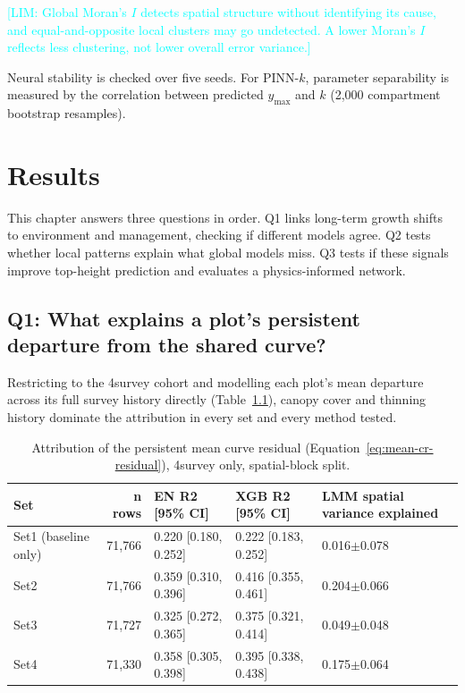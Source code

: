 \documentclass[logo,msc,ai]{infthesis}           %
\newcommand{\limit}[1]{\textcolor{cyan}{[LIM: #1]}}
\begin{document}
\limit{Global Moran's $I$ detects spatial structure without identifying its cause, and equal-and-opposite local clusters may go undetected. A lower Moran's $I$ reflects less clustering, not lower overall error variance.}

Neural stability is checked over five seeds. For PINN-$k$, parameter separability is measured by the correlation between predicted $y_{\max}$ and $k$ (2,000 compartment bootstrap resamples).









\chapter{Results} \label{ch:results}
This chapter answers three questions in order. Q1 links long-term growth shifts to environment and management, checking if different models agree. Q2 tests whether local patterns explain what global models miss. Q3 tests if these signals improve top-height prediction and evaluates a physics-informed network.

\section{Q1: What explains a plot's persistent departure from the shared curve?}

Restricting to the 4survey cohort and modelling each plot's mean departure across its
full survey history directly (Table~\ref{tab:results-rq2b}), canopy cover and thinning
history dominate the attribution in every set and every method tested.

\begin{table}[!htbp]
\centering
\scriptsize
\renewcommand{\arraystretch}{1.2}
\begin{tabular}{lrlll}
\toprule
Set & n rows & EN R2 [95\% CI] & XGB R2 [95\% CI] & LMM spatial variance explained \\
\midrule
Set1 (baseline only) & 71{,}766 & 0.220 [0.180, 0.252] & 0.222 [0.183, 0.252] & 0.016$\pm$0.078 \\
Set2 & 71{,}766 & 0.359 [0.310, 0.396] & 0.416 [0.355, 0.461] & 0.204$\pm$0.066 \\
Set3 & 71{,}727 & 0.325 [0.272, 0.365] & 0.375 [0.321, 0.414] & 0.049$\pm$0.048 \\
Set4 & 71{,}330 & 0.358 [0.305, 0.398] & 0.395 [0.338, 0.438] & 0.175$\pm$0.064 \\
\bottomrule
\end{tabular}
\caption{\small{Attribution of the persistent mean curve residual (Equation~\ref{eq:mean-cr-residual}),
4survey only, spatial-block split.}}
\label{tab:results-rq2b} %
\end{table}
\end{document}

